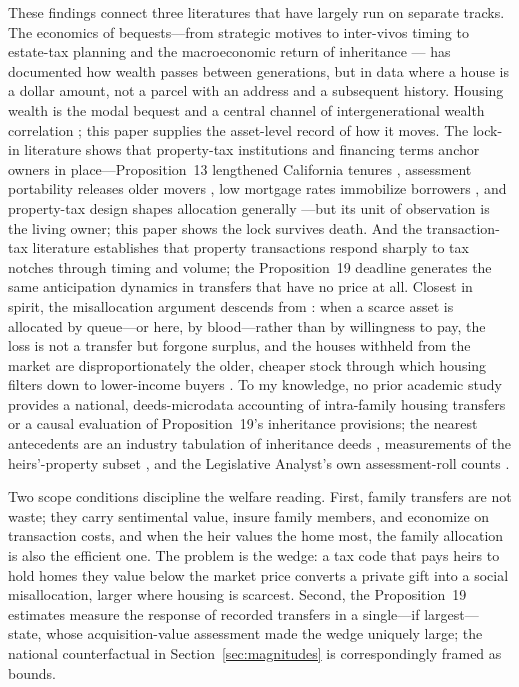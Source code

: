 \documentclass[12pt, letterpaper]{article}
\begin{document}
These findings connect three literatures that have largely run on separate
tracks. The economics of bequests---from strategic motives
\citep{bernheimshleifersummers1985bequest} to inter-vivos timing
\citep{mcgarry1999intervivos} to estate-tax planning \citep{kopczuk2007bequest}
and the macroeconomic return of inheritance \citep{piketty2011inheritance}---
has documented how wealth passes between generations, but in data where a
house is a dollar amount, not a parcel with an address and a subsequent
history. Housing wealth is the modal bequest and a central channel of
intergenerational wealth correlation \citep{charleshurst2003wealth}; this
paper supplies the asset-level record of how it moves. The lock-in
literature shows that property-tax institutions and financing terms anchor
owners in place---Proposition~13 lengthened California tenures
\citep{wasiwhite2005prop13}, assessment portability releases older movers
\citep{ferreira2010takeit}, low mortgage rates immobilize borrowers
\citep{fonsecaliu2024lockin}, and property-tax design shapes allocation
generally \citep{covenetal2024proptax}---but its unit of observation is the
living owner; this paper shows the lock survives death. And the
transaction-tax literature \citep{kopczukmunroe2015mansion,
slemrodwebershan2017dc, bestkleven2018notches, hilberlyytikainen2017transfer}
establishes that property transactions respond sharply to tax notches through
timing and volume; the Proposition~19 deadline generates the same anticipation
dynamics in transfers that have no price at all. Closest in spirit, the
misallocation argument descends from \citet{glaeserluttmer2003rentcontrol}:
when a scarce asset is allocated by queue---or here, by
blood---rather than by willingness to pay, the loss is not a transfer but
forgone surplus, and the houses withheld from the market are disproportionately
the older, cheaper stock through which housing filters down to lower-income
buyers \citep{rosenthal2014filtering}. To my knowledge, no prior academic
study provides a national, deeds-microdata accounting of intra-family housing
transfers or a causal evaluation of Proposition~19's inheritance provisions;
the nearest antecedents are an industry tabulation of inheritance deeds
\citep{delventhal2026inherited}, measurements of the heirs'-property subset
\citep{dobbsgaither2023heirs, burnettwm2025heirs}, and the Legislative
Analyst's own assessment-roll counts \citep{lao2017inheritance}.

Two scope conditions discipline the welfare reading. First, family transfers
are not waste; they carry sentimental value, insure family members, and
economize on transaction costs, and when the heir values the home most, the
family allocation is also the efficient one. The problem is the wedge: a tax
code that pays heirs to hold homes they value below the market price converts
a private gift into a social misallocation, larger where housing is scarcest.
Second, the Proposition~19 estimates measure the response of recorded
transfers in a single---if largest---state, whose acquisition-value assessment
made the wedge uniquely large; the national counterfactual in
Section~\ref{sec:magnitudes} is correspondingly framed as bounds.
\end{document}
